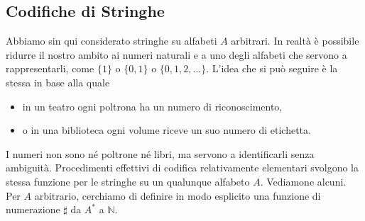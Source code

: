 \subsection{Codifiche di Stringhe}

Abbiamo sin qui considerato stringhe su alfabeti $A$ arbitrari. In realtà è
possibile ridurre il nostro ambito ai numeri naturali e a uno degli alfabeti che
servono a rappresentarli, come $\{1\}$ o $\{0, 1\}$ o $\{0, 1, 2, \ldots\}$.
L'idea che si può seguire è la stessa in base alla quale

\begin{itemize}
    \item in un teatro ogni poltrona ha un numero di riconoscimento,
    \item o in una biblioteca ogni volume riceve un suo numero di etichetta.
\end{itemize}

I numeri non sono né poltrone né libri, ma servono a identificarli senza ambiguità.
Procedimenti effettivi di codifica relativamente elementari svolgono la stessa
funzione per le stringhe su un qualunque alfabeto $A$. Vediamone alcuni. Per $A$
arbitrario, cerchiamo di definire in modo esplicito una funzione di numerazione $\sharp$
da $A^*$ a $\mathbb{N}$.

